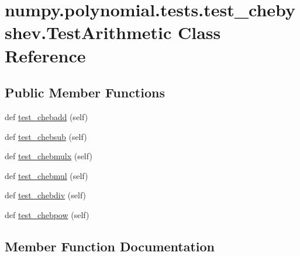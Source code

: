 \hypertarget{classnumpy_1_1polynomial_1_1tests_1_1test__chebyshev_1_1TestArithmetic}{}\section{numpy.\+polynomial.\+tests.\+test\+\_\+chebyshev.\+Test\+Arithmetic Class Reference}
\label{classnumpy_1_1polynomial_1_1tests_1_1test__chebyshev_1_1TestArithmetic}
\subsection*{Public Member Functions}
\begin{DoxyCompactItemize}
\item 
def \hyperlink{classnumpy_1_1polynomial_1_1tests_1_1test__chebyshev_1_1TestArithmetic_ac53b31c24e8c97814228cb6ab2d45b85}{test\+\_\+chebadd} (self)
\item 
def \hyperlink{classnumpy_1_1polynomial_1_1tests_1_1test__chebyshev_1_1TestArithmetic_a30afe07fe54e68e90acf4dd25e30024a}{test\+\_\+chebsub} (self)
\item 
def \hyperlink{classnumpy_1_1polynomial_1_1tests_1_1test__chebyshev_1_1TestArithmetic_ad64eb952eea13480a1771d770a4d5879}{test\+\_\+chebmulx} (self)
\item 
def \hyperlink{classnumpy_1_1polynomial_1_1tests_1_1test__chebyshev_1_1TestArithmetic_aef8a524c0366a53e7f527a72ed27221e}{test\+\_\+chebmul} (self)
\item 
def \hyperlink{classnumpy_1_1polynomial_1_1tests_1_1test__chebyshev_1_1TestArithmetic_a42f14773acb3cca156eab82f70f233c2}{test\+\_\+chebdiv} (self)
\item 
def \hyperlink{classnumpy_1_1polynomial_1_1tests_1_1test__chebyshev_1_1TestArithmetic_a323719769e37a1eaf3eadec156d75ed8}{test\+\_\+chebpow} (self)
\end{DoxyCompactItemize}


\subsection{Member Function Documentation}
\mbox{\label{classnumpy_1_1polynomial_1_1tests_1_1test__chebyshev_1_1TestArithmetic_ac53b31c24e8c97814228cb6ab2d45b85}} 
